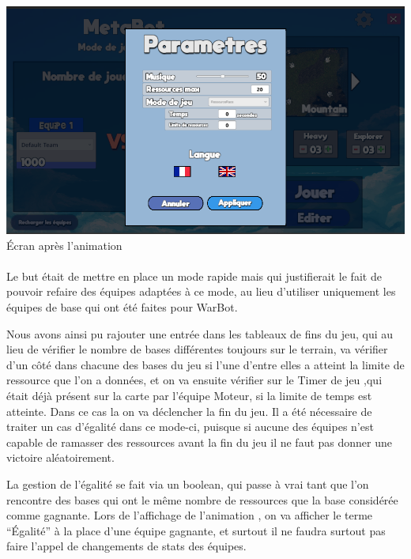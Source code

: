 \documentclass{report}
\begin{document}
\paragraph{}
\begin{center}
\includegraphics[scale=0.5]{DATA/param.png}
 {Écran après l’animation}
\end{center}
\paragraph{}


Le but était de mettre en place un mode rapide mais qui justifierait le fait de pouvoir refaire des équipes adaptées à ce mode, au lieu d’utiliser uniquement les équipes de base qui ont été faites pour WarBot.

Nous avons ainsi pu rajouter une entrée dans les tableaux de fins du jeu, qui au lieu de vérifier le nombre de bases différentes toujours sur le terrain, va vérifier d’un côté dans chacune des bases du jeu si l’une d’entre elles a atteint la limite de ressource que l’on a données, et on va ensuite vérifier sur le Timer de jeu ,qui était déjà présent sur la carte par l’équipe Moteur, si la limite de temps est atteinte. Dans ce cas la on va déclencher la fin du jeu.
Il a été nécessaire de traiter un cas d’égalité dans ce mode-ci, puisque si aucune des équipes n’est capable de ramasser des ressources avant la fin du jeu il ne faut pas donner une victoire aléatoirement. 

La gestion de l’égalité se fait via un boolean, qui passe à vrai tant que l’on rencontre des bases qui ont le même nombre de ressources que la base considérée comme gagnante. 
Lors de l’affichage de l’animation , on va afficher le terme “Égalité” à la place d’une équipe gagnante, et surtout il ne faudra surtout pas faire l’appel de changements de stats des équipes.
\end{document}
